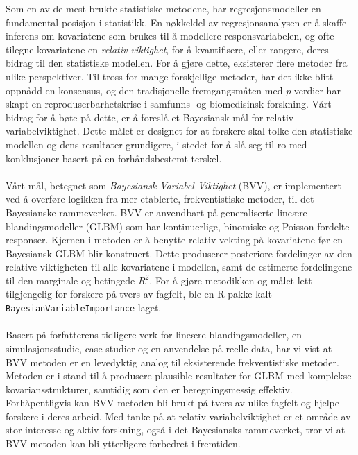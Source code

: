 Som en av de mest brukte statistiske metodene, har regresjonsmodeller en fundamental posisjon i statistikk. En nøkkeldel av regresjonsanalysen er å skaffe inferens om kovariatene som brukes til å modellere responsvariabelen, og ofte tilegne kovariatene en \textit{relativ viktighet}, for å kvantifisere, eller rangere, deres bidrag til den statistiske modellen. For å gjøre dette, eksisterer flere metoder fra ulike perspektiver. Til tross for mange forskjellige metoder, har det ikke blitt oppnådd en konsensus, og den tradisjonelle fremgangsmåten med $p$-verdier har skapt en reproduserbarhetskrise i samfunns- og biomedisinsk forskning. Vårt bidrag for å bøte på dette, er å foreslå et Bayesiansk mål for relativ variabelviktighet. Dette målet er designet for at forskere skal tolke den statistiske modellen og dens resultater grundigere, i stedet for å slå seg til ro med konklusjoner basert på en forhåndsbestemt terskel.
\\
\\
Vårt mål, betegnet som \textit{Bayesiansk Variabel Viktighet} (BVV), er implementert ved å overføre logikken fra mer etablerte, frekventistiske metoder, til det Bayesianske rammeverket. BVV er anvendbart på generaliserte lineære blandingsmodeller (GLBM) som har kontinuerlige, binomiske og Poisson fordelte responser. Kjernen i metoden er å benytte relativ vekting på kovariatene før en Bayesiansk GLBM blir konstruert. Dette produserer posteriore fordelinger av den relative viktigheten til alle kovariatene i modellen, samt de estimerte fordelingene til den marginale og betingede $R^2$. For å gjøre metodikken og målet lett tilgjengelig for forskere på tvers av fagfelt, ble en R pakke kalt \texttt{BayesianVariableImportance} laget.
\\
\\
Basert på forfatterens tidligere verk \citet{Arnstad:Relative_variable_importance_in_Bayesian_linear_mixed_models:2024} for lineære blandingsmodeller, en simulasjonsstudie, case studier og en anvendelse på reelle data, har vi vist at BVV metoden er en levedyktig analog til eksisterende frekventistiske metoder. Metoden er i stand til å produsere plausible resultater for GLBM med komplekse kovariansstrukturer, samtidig som den er beregningsmessig effektiv. Forhåpentligvis kan BVV metoden bli brukt på tvers av ulike fagfelt og hjelpe forskere i deres arbeid. Med tanke på at relativ variabelviktighet er et område av stor interesse og aktiv forskning, også i det Bayesiansks rammeverket, tror vi at BVV metoden kan bli ytterligere forbedret i fremtiden.